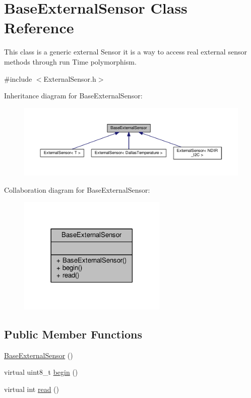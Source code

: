 \hypertarget{class_base_external_sensor}{}\section{Base\+External\+Sensor Class Reference}
\label{class_base_external_sensor}


This class is a generic external Sensor it is a way to access real external sensor methods through run Time polymorphism.  




{\ttfamily \#include $<$External\+Sensor.\+h$>$}



Inheritance diagram for Base\+External\+Sensor\+:\nopagebreak
\begin{figure}[H]
\begin{center}
\leavevmode
\includegraphics[width=350pt]{class_base_external_sensor__inherit__graph}
\end{center}
\end{figure}


Collaboration diagram for Base\+External\+Sensor\+:\nopagebreak
\begin{figure}[H]
\begin{center}
\leavevmode
\includegraphics[width=201pt]{class_base_external_sensor__coll__graph}
\end{center}
\end{figure}
\subsection*{Public Member Functions}
\begin{DoxyCompactItemize}
\item 
\hyperlink{class_base_external_sensor_a978d96a6563b646efb358c2790a9fc6f}{Base\+External\+Sensor} ()
\item 
virtual uint8\+\_\+t \hyperlink{class_base_external_sensor_a87d132803d4f4fdd4e66332809f0c9a0}{begin} ()
\item 
virtual int \hyperlink{class_base_external_sensor_a7e0a98f350148d7645031315657aa5ec}{read} ()
\end{DoxyCompactItemize}


